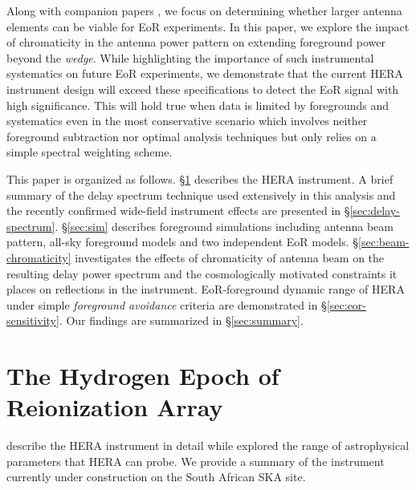 \documentclass[preprint2,iop,numberedappendix,twocolappendix,appendixfloats]{emulateapj}
\begin{document}

Along with companion papers \citep{ewa16,neb16,pat16}, we focus on determining whether larger antenna elements can be viable for EoR experiments. In this paper, we explore the impact of chromaticity in the antenna power pattern on extending foreground power beyond the {\it wedge}. While highlighting the importance of such instrumental systematics on future EoR experiments, we demonstrate that the current HERA instrument design will exceed these specifications to detect the EoR signal with high significance. This will hold true when data is limited by foregrounds and systematics even in the most conservative scenario which involves neither foreground subtraction nor optimal analysis techniques but only relies on a simple spectral weighting scheme. 

This paper is organized as follows. \S\ref{sec:HERA} describes the HERA instrument. A brief summary of the delay spectrum technique used extensively in this analysis and the recently confirmed wide-field instrument effects are presented in \S\ref{sec:delay-spectrum}. \S\ref{sec:sim} describes foreground simulations including antenna beam pattern, all-sky foreground models and two independent EoR models. \S\ref{sec:beam-chromaticity} investigates the effects of chromaticity of antenna beam on the resulting delay power spectrum and the cosmologically motivated constraints it places on reflections in the instrument. EoR-foreground dynamic range of HERA under simple {\it foreground avoidance} criteria are demonstrated in \S\ref{sec:eor-sensitivity}. Our findings are summarized in \S\ref{sec:summary}.

\section{The Hydrogen Epoch of Reionization Array}\label{sec:HERA}

\citet{deb16} describe the HERA instrument in detail while \citet{pob14} explored the range of astrophysical parameters that HERA can probe. We provide a summary of the instrument currently under construction on the South African SKA site.
\end{document}
